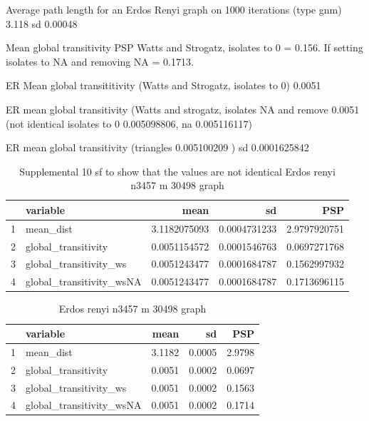 Average path length for an Erdos Renyi graph on 1000 iterations (type gnm) 3.118 sd 0.00048

Mean global transitivity PSP Watts and Strogatz, isolates to 0 = 0.156. If setting isolates to NA and removing NA = 0.1713.

ER Mean global transititivity (Watts and Strogatz, isolates to 0) 0.0051

ER mean global transitivity (Watts and strogatz, isolates NA and remove 0.0051 (not identical isolates to 0 0.005098806, na 0.005116117)

ER mean global transitivity (triangles 0.005100209 ) sd 0.0001625842

\begin{table}[ht]
\centering
\begin{tabular}{rlrrr}
  \hline
 & variable & mean & sd & PSP \\ 
  \hline
1 & mean\_dist & 3.1182075093 & 0.0004731233 & 2.9797920751 \\ 
  2 & global\_transitivity & 0.0051154572 & 0.0001546763 & 0.0697271768 \\ 
  3 & global\_transitivity\_ws & 0.0051243477 & 0.0001684787 & 0.1562997932 \\ 
  4 & global\_transitivity\_wsNA & 0.0051243477 & 0.0001684787 & 0.1713696115 \\ 
   \hline
\end{tabular}
\caption{Supplemental 10 sf to show that the values are not identical Erdos renyi n3457 m 30498 graph}
\label{tab:transitivity_erdos_renyi 10sf}
\end{table}

\begin{table}[ht]
\centering
\begin{tabular}{rlrrr}
  \hline
 & variable & mean & sd & PSP \\ 
  \hline
1 & mean\_dist & 3.1182 & 0.0005 & 2.9798 \\ 
  2 & global\_transitivity & 0.0051 & 0.0002 & 0.0697 \\ 
  3 & global\_transitivity\_ws & 0.0051 & 0.0002 & 0.1563 \\ 
  4 & global\_transitivity\_wsNA & 0.0051 & 0.0002 & 0.1714 \\ 
   \hline
\end{tabular}
\caption{Erdos renyi n3457 m 30498 graph}
\label{tab:transitivity_erdos_renyi}
\end{table}

